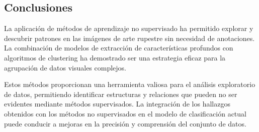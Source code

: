 \subsection{Conclusiones}

La aplicación de métodos de aprendizaje no supervisado ha permitido explorar y descubrir patrones en las imágenes de arte rupestre sin necesidad de anotaciones.
La combinación de modelos de extracción de características profundos con algoritmos de clustering ha demostrado ser una estrategia eficaz para la agrupación de datos visuales complejos.

Estos métodos proporcionan una herramienta valiosa para el análisis exploratorio de datos, permitiendo identificar estructuras y relaciones que pueden no ser evidentes mediante métodos supervisados.
La integración de los hallazgos obtenidos con los métodos no supervisados en el modelo de clasificación actual puede conducir a mejoras en la precisión y comprensión del conjunto de datos.

\newpage

%
%
%

